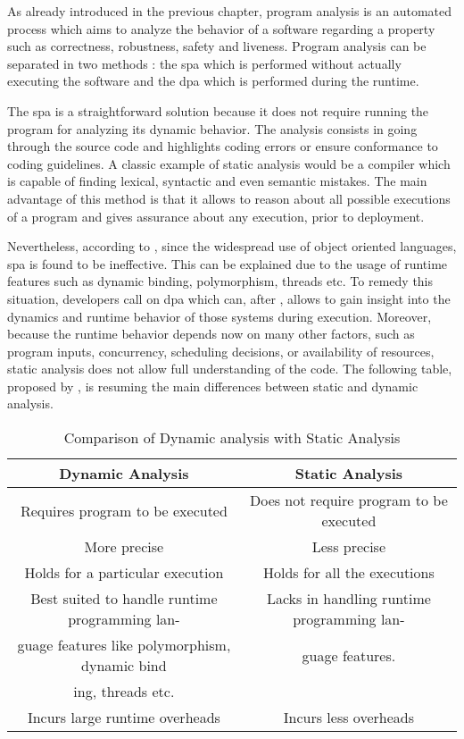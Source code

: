 As already introduced in the previous chapter, program analysis is an automated process which aims to analyze the behavior of a software regarding a property such as correctness, robustness, safety and liveness. Program analysis can be separated in two methods : the \gls{spa} which is performed without actually executing the software and the \gls{dpa} which is performed during the runtime. \citep{Wikipedi2016}

The \gls{spa} is a straightforward solution because it does not require running the program for analyzing its dynamic behavior. The analysis consists in going through the source code and highlights coding errors or ensure conformance to coding guidelines. A classic example of static analysis would be a compiler which is capable of finding lexical, syntactic and even semantic mistakes. The main advantage of this method is that it allows to reason about all possible executions of a program and gives assurance about any execution, prior to deployment. 

Nevertheless, according to \cite{Gosain2015}, since the widespread use of object oriented languages, \gls{spa} is found to be ineffective. This can be explained due to the usage of runtime features such as dynamic binding, polymorphism, threads etc. To remedy this situation, developers call on \gls{dpa} which can, after \cite{Marek2015100}, allows to gain insight into the dynamics and runtime behavior of those systems during execution. Moreover, because the runtime behavior depends now on many other factors, such as program inputs, concurrency, scheduling decisions, or availability of resources, static analysis does not allow full understanding of the code. The following table, proposed by \cite{Gosain2015}, is resuming the main differences between static and dynamic analysis.

\bigskip

\begin{table}[htb]
\begin{center}
\begin{tabulary}{\textwidth}{CC}
  \hline
  Dynamic Analysis 	& Static Analysis \\\hline
  Requires program to be executed	& Does not require program to be executed \\
  More precise & Less precise \\
  Holds for a particular execution & Holds for all the executions \\
  Best suited to handle runtime programming lan- & Lacks in handling runtime programming lan-\\
guage features like polymorphism, dynamic bind & guage features.\\
ing, threads etc. &  \\
  Incurs large runtime overheads & Incurs less overheads \\\hline
\end{tabulary}
\end{center}
\caption{Comparison of Dynamic analysis with Static Analysis}
\label{list:comparaison}
\end{table}

